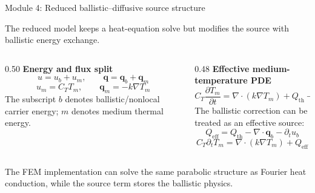 \documentclass[aspectratio=169,9pt]{beamer}
\newcommand{\grad}{\nabla}
\newcommand{\divg}{\nabla\!\cdot}
\newcommand{\vect}[1]{\bm{#1}}
\begin{document}
\begin{frame}{Module 4: Reduced ballistic--diffusive source structure}
\footnotesize
\vspace{-3mm}
\begin{bluebox}
\centering
The reduced model keeps a heat-equation solve but modifies the source with ballistic energy exchange.
\end{bluebox}

\vspace{1mm}
\begin{columns}[T,totalwidth=\textwidth]
\begin{column}{0.50\textwidth}
\textbf{Energy and flux split}
\begin{equation*}
\boxed{u=u_b+u_m},\qquad
\boxed{\vect{q}=\vect{q}_b+\vect{q}_m}
\end{equation*}
\begin{equation*}
\boxed{u_m=C_T T_m},\qquad
\boxed{\vect{q}_m=-k\grad T_m}
\end{equation*}
\small
The subscript \(b\) denotes ballistic/nonlocal carrier energy; \(m\) denotes medium thermal energy.
\end{column}
\begin{column}{0.48\textwidth}
\textbf{Effective medium-temperature PDE}
\begin{equation*}
\boxed{C_T\frac{\partial T_m}{\partial t}
=\divg(k\grad T_m)
+Q_{\mathrm{th}}
-\divg\vect{q}_b
-\frac{\partial u_b}{\partial t}}
\end{equation*}
\small
The ballistic correction can be treated as an effective source:
\begin{equation*}
\boxed{Q_{\mathrm{eff}}=Q_{\mathrm{th}}-\divg\vect{q}_b-\partial_t u_b}
\end{equation*}
\begin{equation*}
\boxed{C_T\partial_t T_m=\divg(k\grad T_m)+Q_{\mathrm{eff}}}
\end{equation*}
\end{column}
\end{columns}

\vspace{1mm}
\begin{purplebox}
\centering\scriptsize
The FEM implementation can solve the same parabolic structure as Fourier heat conduction, while the source term stores the ballistic physics.
\end{purplebox}
\end{frame}
\end{document}
